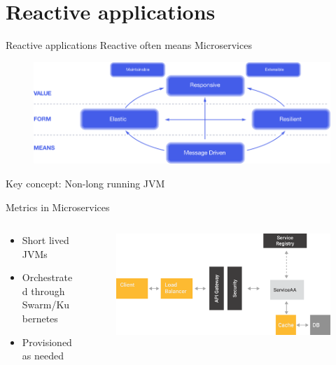 \documentclass{beamer}
\begin{document}
\section{Reactive applications}
\begin{frame}{Reactive applications}
Reactive often means Microservices
\begin{figure}
	\centering
	\includegraphics[width=\linewidth]{Images/reactive-traits}
\end{figure}
Key concept: Non-long running JVM
\end{frame}


\begin{frame}{Metrics in Microservices}
\begin{columns}[T] %
	\begin{column}[T]{3cm} %
		\begin{itemize}
			\item Short lived JVMs
			\item Orchestrated through Swarm/Kubernetes
			\item Provisioned as needed
		\end{itemize}
	\end{column}
	\begin{column}[T]{7cm} %
		\begin{figure}
			\centering
			\includegraphics[width=\linewidth]{Images/microservicios}
		\end{figure}
		
	\end{column}
\end{columns}
\end{frame}
\end{document}
